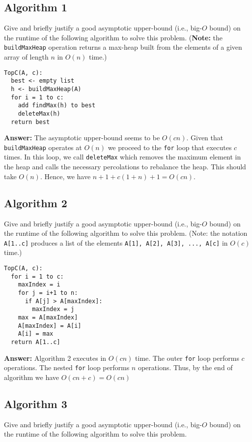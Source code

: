 \documentclass[11pt, oneside]{article}   	%
\theoremstyle{definition}
\theoremstyle{remark}
\begin{document}
\subsection{Algorithm 1}

Give and briefly justify a good asymptotic upper-bound (i.e., big-$O$
bound) on the runtime of the following algorithm to solve this
problem. (\textbf{Note:} the \texttt{buildMaxHeap} operation returns a max-heap
built from the elements of a given array of length $n$ in $O(n)$
time.)

\begin{verbatim}
TopC(A, c):
  best <- empty list
  h <- buildMaxHeap(A)
  for i = 1 to c:
    add findMax(h) to best
    deleteMax(h)
  return best
\end{verbatim}

\textbf{Answer: } The asymptotic upper-bound seems to be $O(cn)$. Given that \texttt{buildMaxHeap} operates at $O(n)$ we proceed to the \texttt{for} loop that executes $c$ times. In this loop, we call \texttt{deleteMax} which removes the maximum element in the heap and calls the necessary percolations to rebalance the heap. This should take $O(n)$. Hence, we have $n+1+c(1+n)+1 = O(cn)$.

\subsection{Algorithm 2}

Give and briefly justify a good asymptotic upper-bound (i.e., big-$O$
bound) on the runtime of the following algorithm to solve this
problem. (Note: the notation \texttt{A[1..c]} produces a list of the elements
\texttt{A[1], A[2], A[3], ..., A[c]} in $O(c)$ time.)

\begin{verbatim}
TopC(A, c):
  for i = 1 to c:
    maxIndex = i
    for j = i+1 to n:
      if A[j] > A[maxIndex]:
        maxIndex = j
    max = A[maxIndex]
    A[maxIndex] = A[i]
    A[i] = max
  return A[1..c]
\end{verbatim}

\textbf{Answer: } Algorithm 2 executes in $O(cn)$ time. The outer \texttt{for} loop  performs $c$ operations. The nested \texttt{for} loop performs  $n$ operations. Thus, by the end of algorithm we have $O(cn + c) = O(cn)$
\subsection{Algorithm 3}

Give and briefly justify a good asymptotic upper-bound (i.e., big-$O$
bound) on the runtime of the following algorithm to solve this
problem.
\end{document}
